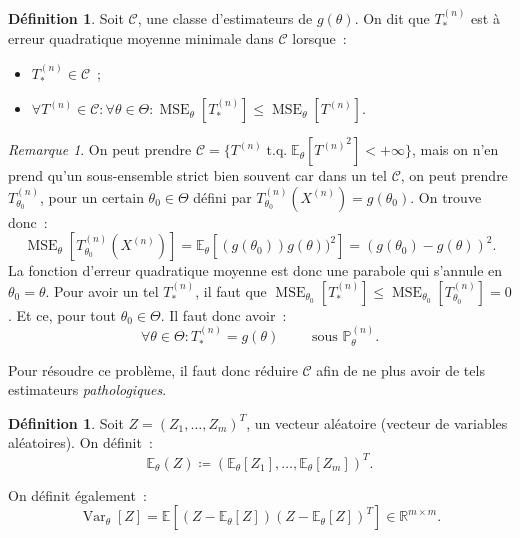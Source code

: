 \documentclass{report}
\DeclareMathOperator{\tq}{\text{ t.q. }}
\DeclareMathOperator{\Var}{Var}
\DeclareMathOperator{\MSE}{MSE}
\renewcommand{\P}{\mathbb P}
\newcommand{\E}{\mathbb E}
\newcommand{\pinfty}{{+\infty}}
\newcommand{\R}{\mathbb R}
\newcommand{\Xn}{{X^{(n)}}}
\newcommand{\Tn}{{T^{(n)}}}
\theoremstyle{definition}
\newtheorem{déf}[thm]{Définition}
\theoremstyle{remark}
\newtheorem*{rmq}{Remarque}
\begin{document}
			\begin{déf} Soit $\mathcal C$, une classe d'estimateurs de $g(\theta)$. On dit que $T_*^{(n)}$ est à erreur quadratique moyenne minimale dans $\mathcal C$
			lorsque~:
			\begin{itemize}
				\item $T_*^{(n)} \in \mathcal C$~;
				\item $\forall \Tn \in \mathcal C : \forall \theta \in \Theta : \MSE_\theta[T_*^{(n)}] \leq \MSE_\theta[\Tn]$.
			\end{itemize}
			\end{déf}

			\begin{rmq} On peut prendre $\mathcal C = \{\Tn \tq \E_\theta[\Tn^2] < \pinfty\}$, mais on n'en prend qu'un sous-ensemble strict bien souvent car dans un tel
			$\mathcal C$, on peut prendre $T_{\theta_0}^{(n)}$, pour un certain $\theta_0 \in \Theta$ défini par $T_{\theta_0}^{(n)}(\Xn) = g(\theta_0)$.
			On trouve donc~:
			\[\MSE_\theta[T_{\theta_0}^{(n)}(\Xn)] = \E_\theta[(g(\theta_0) ) g(\theta))^2] = (g(\theta_0) - g(\theta))^2.\]
			La fonction d'erreur quadratique moyenne est donc une parabole qui s'annule en $\theta_0 = \theta$. Pour avoir un tel $T_*^{(n)}$, il faut que
			$\MSE_{\theta_0}[T_*^{(n)}] \leq \MSE_{\theta_0}[T_{\theta_0}^{(n)}] = 0$. Et ce, pour tout $\theta_0 \in \Theta$. Il faut donc avoir~:
			\[\forall \theta \in \Theta : T_*^{(n)} = g(\theta)\qquad\text{ sous }\P_\theta^{(n)}.\]

			Pour résoudre ce problème, il faut donc réduire $\mathcal C$ afin de ne plus avoir de tels estimateurs \textit{pathologiques}.
			\end{rmq}

			\begin{déf} Soit $Z = (Z_1, \ldots, Z_m)^T$, un vecteur aléatoire (vecteur de variables aléatoires). On définit~:
			\[\E_\theta(Z) \coloneqq (\E_\theta[Z_1], \ldots, \E_\theta[Z_m])^T.\]

			On définit également~:
			\[\Var_\theta[Z] = \E\left[(Z - \E_\theta[Z])(Z - \E_\theta[Z])^T\right] \in \R^{m \times m}.\]
			\end{déf}
\end{document}
